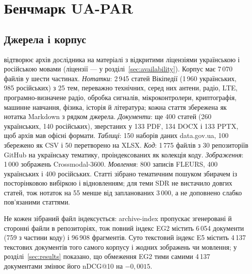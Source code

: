 \section{Бенчмарк UA-PAR}\label{sec:uapar}

\subsection{Джерела і корпус}
\uapar{} відтворює архів дослідника на матеріалі з відкритими ліцензіями українською і російською мовами (ліцензії --- у розділі~\ref{sec:availability}). Корпус має 7\,070 файлів у шести частинах. \emph{Нотатки}: 2\,945 статей Вікіпедії (1\,960 українських, 985 російських) з 25 тем, переважно технічних, серед них антени, радіо, LTE, програмно-визначене радіо, обробка сигналів, мікроконтролери, криптографія, машинне навчання, фізика, історія й література; кожна стаття збережена як нотатка Markdown з рядком джерела. \emph{Документи}: ще 400 статей (260 українських, 140 російських), зверстаних у 133 PDF, 134 DOCX і 133 PPTX, щоб архів мав офісні формати. \emph{Таблиці}: 150 наборів даних data.gov.ua, 100 збережено як CSV і 50 перетворено на XLSX. \emph{Код}: 1\,775 файлів з 30 репозиторіїв GitHub на українську тематику, проіндексованих як колекція коду. \emph{Зображення}: 1\,000 зображень Crossmodal-3600. \emph{Мовлення}: 800 записів FLEURS, 400 українських і 400 російських. Статті зібрано тематичним пошуком збирачем із посторінковою вибіркою і відновленням; для теми SDR не вистачило довгих статей, тож нотаток на 55 менше від запланованих 3\,000, а не доповнено слабко пов'язаними статтями.

Не кожен зібраний файл індексується: archive-index пропускає згенеровані й сторонні файли в репозиторіях, тож повний індекс EG2 містить 6\,054 документи (759 з частини коду) і 96\,908 фрагментів. Суто текстовий індекс E5 містить 4\,137 текстових документів того самого корпусу і жодних зображень чи мовлення; у розділі~\ref{sec:results} показано, що обмеження EG2 тими самими 4\,137 документами змінює його nDCG@10 на $-0{,}0015$.


